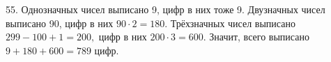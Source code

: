 55. Однозначных чисел выписано 9, цифр в них тоже 9. Двузначных чисел выписано 90, цифр в них $90\cdot2=180.$ Трёхзначных чисел выписано $299-100+1=200,$ цифр в них $200\cdot3=600.$ Значит, всего выписано $9+180+600=789$ цифр.\\

